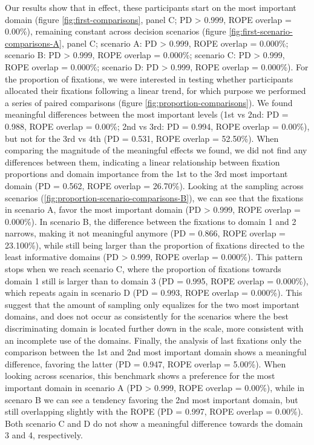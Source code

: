 \documentclass[
  english,
  man]{apa6}
\begin{document}
Our results show that in effect, these participants start on the most important domain (figure \ref{fig:first-comparisons}, panel C; PD \textgreater{} 0.999, ROPE overlap = 0.00\%), remaining constant across decision scenarios (figure \ref{fig:first-scenario-comparisons-A}, panel C; scenario A: PD \textgreater{} 0.999, ROPE overlap = 0.000\%; scenario B: PD \textgreater{} 0.999, ROPE overlap = 0.000\%; scenario C: PD \textgreater{} 0.999, ROPE overlap = 0.000\%; scenario D: PD \textgreater{} 0.999, ROPE overlap = 0.000\%). For the proportion of fixations, we were interested in testing whether participants allocated their fixations following a linear trend, for which purpose we performed a series of paired comparisons (figure \ref{fig:proportion-comparisons}). We found meaningful differences between the most important levels (1st vs 2nd: PD = 0.988, ROPE overlap = 0.00\%; 2nd vs 3rd: PD = 0.994, ROPE overlap = 0.00\%), but not for the 3rd vs 4th (PD = 0.531, ROPE overlap = 52.50\%). When comparing the magnitude of the meaningful effects we found, we did not find any differences between them, indicating a linear relationship between fixation proportions and domain importance from the 1st to the 3rd most important domain (PD = 0.562, ROPE overlap = 26.70\%). Looking at the sampling across scenarios (\ref{fig:proportion-scenario-comparisons-B}), we can see that the fixations in scenario A, favor the most important domain (PD \textgreater{} 0.999, ROPE overlap = 0.000\%). In scenario B, the difference between the fixations to domain 1 and 2 narrows, making it not meaningful anymore (PD = 0.866, ROPE overlap = 23.100\%), while still being larger than the proportion of fixations directed to the least informative domains (PD \textgreater{} 0.999, ROPE overlap = 0.000\%). This pattern stops when we reach scenario C, where the proportion of fixations towards domain 1 still is larger than to domain 3 (PD = 0.995, ROPE overlap = 0.000\%), which repeats again in scenario D (PD = 0.993, ROPE overlap = 0.000\%). This suggest that the amount of sampling only equalizes for the two most important domains, and does not occur as consistently for the scenarios where the best discriminating domain is located further down in the scale, more consistent with an incomplete use of the domains. Finally, the analysis of last fixations only the comparison between the 1st and 2nd most important domain shows a meaningful difference, favoring the latter (PD = 0.947, ROPE overlap = 5.00\%). When looking across scenarios, this benchmark shows a preference for the most important domain in scenario A (PD \textgreater{} 0.999, ROPE overlap = 0.00\%), while in scenaro B we can see a tendency favoring the 2nd most important domain, but still overlapping slightly with the ROPE (PD = 0.997, ROPE overlap = 0.00\%). Both scenario C and D do not show a meaningful difference towards the domain 3 and 4, respectively.
\end{document}

